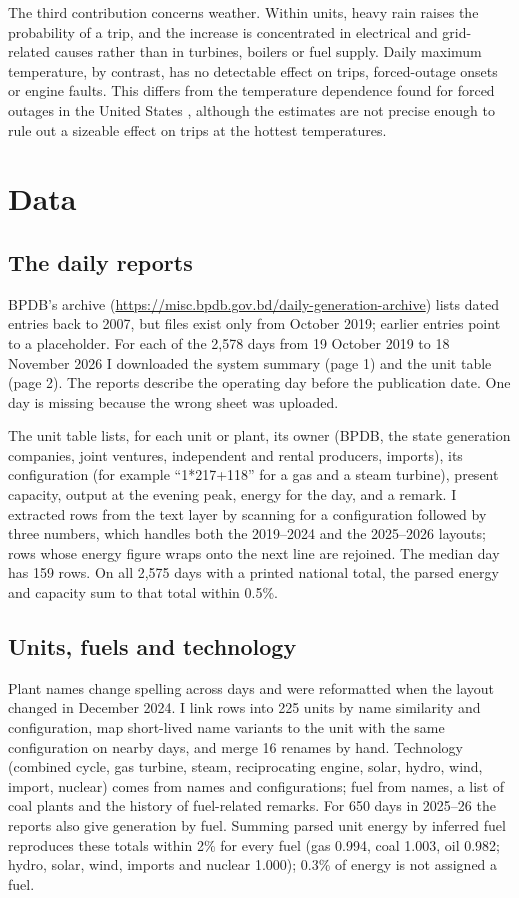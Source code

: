 \documentclass[11pt]{article}
\begin{document}
The third contribution concerns weather. Within units, heavy rain raises the probability of a trip, and the increase is concentrated in electrical and grid-related causes rather than in turbines, boilers or fuel supply. Daily maximum temperature, by contrast, has no detectable effect on trips, forced-outage onsets or engine faults. This differs from the temperature dependence found for forced outages in the United States \citep{murphy2019timedependent}, although the estimates are not precise enough to rule out a sizeable effect on trips at the hottest temperatures.

\section{Data}

\subsection{The daily reports}
BPDB's archive (\url{https://misc.bpdb.gov.bd/daily-generation-archive}) lists dated entries back to 2007, but files exist only from October 2019; earlier entries point to a placeholder. For each of the 2,578 days from 19 October 2019 to 18 November 2026 I downloaded the system summary (page 1) and the unit table (page 2). The reports describe the operating day before the publication date. One day is missing because the wrong sheet was uploaded.

The unit table lists, for each unit or plant, its owner (BPDB, the state generation companies, joint ventures, independent and rental producers, imports), its configuration (for example ``1*217+118'' for a gas and a steam turbine), present capacity, output at the evening peak, energy for the day, and a remark. I extracted rows from the text layer by scanning for a configuration followed by three numbers, which handles both the 2019--2024 and the 2025--2026 layouts; rows whose energy figure wraps onto the next line are rejoined. The median day has 159 rows. On all 2,575 days with a printed national total, the parsed energy and capacity sum to that total within 0.5\%.

\subsection{Units, fuels and technology}
Plant names change spelling across days and were reformatted when the layout changed in December 2024. I link rows into 225 units by name similarity and configuration, map short-lived name variants to the unit with the same configuration on nearby days, and merge 16 renames by hand. Technology (combined cycle, gas turbine, steam, reciprocating engine, solar, hydro, wind, import, nuclear) comes from names and configurations; fuel from names, a list of coal plants and the history of fuel-related remarks. For 650 days in 2025--26 the reports also give generation by fuel. Summing parsed unit energy by inferred fuel reproduces these totals within 2\% for every fuel (gas 0.994, coal 1.003, oil 0.982; hydro, solar, wind, imports and nuclear 1.000); 0.3\% of energy is not assigned a fuel.
\end{document}
